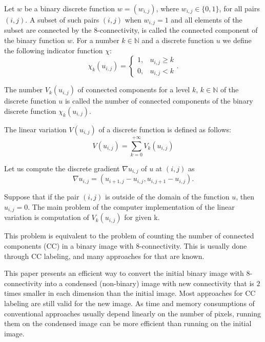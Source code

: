 \documentclass[hidelinks]{llncs}
\newcommand*{\N}{\mathbb{N} \xspace}
\begin{document}
Let $w$ be a binary discrete function $w=(w_{i,j})$, where $w_{i,j} \in \{0,1\}$,
for all pairs $(i,j)$.
A subset of such pairs $(i, j)$ when $w_{i,j}=1$ and all elements of the subset are
connected by the 8-connectivity, is called the connected component of the binary
function $w$.
For a number $k \in \N$ and a discrete function $u$ we define the following
indicator function $\chi$:
\begin{equation}
  \chi_k (u_{i,j}) =
    \begin{cases}
      1, & u_{i,j} \ge k \\
      0, & u_{i,j} < k
    \end{cases}.
  \label{eq:chiIndicator}
\end{equation}

\begin{definition}
  The number $V_k(u_{i,j})$ of connected components for a level $k$, $k \in \N$ of
  the discrete function $u$ is called the number of connected components of the 
  binary discrete function $\chi_k(u_{i,j})$.
\end{definition}

\begin{definition}
  The linear variation $V(u_{i,j})$ of a discrete function  is defined as follows:
  \begin{equation}
    V(u_{i,j}) = \sum_{k=0}^{+\infty} V_k(u_{i,j})
    \label{eq:V}
  \end{equation}
\end{definition}

Let us compute the discrete gradient $\nabla u_{i,j}$ of $u$ at $(i,j)$ as
\begin{equation}
  \nabla u_{i,j} = (u_{i+1,j} - u_{i,j}, u_{i,j+1} - u_{i,j}).
  \label{eq:gradient}
\end{equation}

Suppose that if the pair $(i,j)$ is outside of the domain of the function $u$, then 
$u_{i,j} = 0$.
The main problem of the computer implementation of the linear variation is 
computation of $V_k(u_{i,j})$ for given k.


This problem is equivalent to the problem of counting the number of connected
components (CC) in a binary image with 8-connectivity.
This is usually done through CC labeling, and many approaches for that are
known\cite{hechao}.

This paper presents an efficient way to convert the initial binary image
with 8-connectivity into
a condensed (non-binary) image with new connectivity that is $2$ times smaller in
each dimension than the initial image.
Most approaches for CC labeling are still valid for the new image.
As time and memory consumptions of conventional approaches usually depend linearly on
the number of pixels, running them on the condensed image can be
more efficient than running on the initial image.
\end{document}
